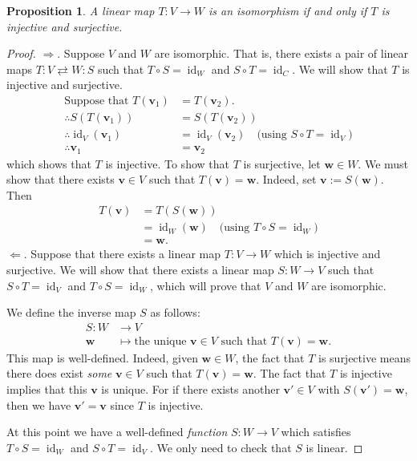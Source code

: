 \documentclass[a4paper,11pt]{book}
\newtheorem{proposition}[theorem]{Proposition}
\theoremstyle{definition}
\newcommand{\ve}[1]{\mathbf{#1}}
\DeclareMathOperator{\id}{id}
\begin{document}
\begin{proposition} \label{iso-inj-surj} A linear map $T : V \rightarrow W$ is an isomorphism if and only if $T$ is injective and surjective.
\end{proposition}
\begin{proof}
$\Rightarrow$. Suppose $V$ and $W$ are isomorphic. That is, there exists a pair of linear maps $T : V\rightleftarrows W : S$ such that $T \circ S = \id_W$ and $S \circ T = \id_C$. We will show that $T$ is injective and surjective.
\begin{align*}
\mbox{Suppose that } T(\ve{v}_1) &= T(\ve{v}_2). \\
\therefore S(T(\ve{v}_1)) &= S(T(\ve{v}_2)) \\
 \therefore \id_V(\ve{v}_1) &= \id_V(\ve{v}_2) \quad \mbox{(using $S \circ T = \id_V$)} \\
 \therefore \ve{v}_1 &= \ve{v}_2  
\end{align*}
which shows that $T$ is injective. To show that $T$ is surjective, let $\ve{w} \in W$. We must show that there exists $\ve{v} \in V$ such that $T(\ve{v}) = \ve{w}$. Indeed, set $\ve{v} := S(\ve{w})$. Then 
 \begin{align*}
  T(\ve{v}) &= T(S(\ve{w})) \\
   &= \id_W (\ve{w}) \quad \mbox{(using $T \circ S = \id_W$)} \\
   &= \ve{w}. 
 \end{align*}
$\Leftarrow$. Suppose that there exists a linear map $T : V \rightarrow W$ which is injective and surjective. We will show that there exists a linear map $S : W \rightarrow V$ such that $S \circ T = \id_V$ and $T \circ S = \id_W$, which will prove that $V$ and $W$ are isomorphic.

We define the inverse map $S$ as follows:
\begin{align*}
 S : W & \rightarrow V \\
  \ve{w} & \mapsto \mbox{the unique $\ve{v} \in V$ such that $T(\ve{v}) = \ve{w}$.}
\end{align*}
This map is well-defined. Indeed, given $\ve{w} \in W$, the fact that $T$ is surjective means there does exist {\em some} $\ve{v} \in V$ such that $T(\ve{v}) = \ve{w}$. The fact that $T$ is injective implies that this $\ve{v}$ is unique. For if there exists another $\ve{v}' \in V$ with $S(\ve{v}') = \ve{w}$, then we have $\ve{v}' = \ve{v}$ since $T$ is injective. 

At this point we have a well-defined {\em function} $S : W \rightarrow V$ which satisfies $T \circ S = \id_W$ and $S \circ T = \id_V$. We only need to check that $S$ is linear. 


\end{proof}
\end{document}

